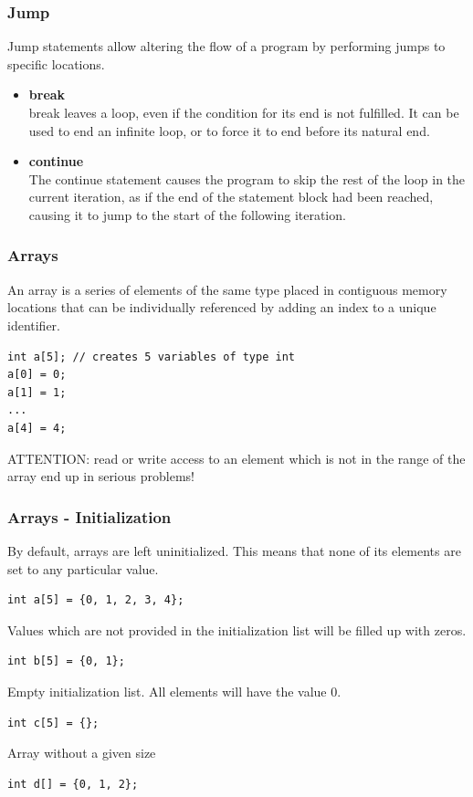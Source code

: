 \begin{frame}[fragile]
  \frametitle{Jump}
  Jump statements allow altering the flow of a program by performing jumps to specific locations.
  \begin{itemize}
  \item {\bf break}\\
  break leaves a loop, even if the condition for its end is not fulfilled.
  It can be used to end an infinite loop, or to force it to end before its natural end.
  \item {\bf continue}\\
  The continue statement causes the program to skip the rest of the loop in the current iteration, as if the end of the statement block had been reached,
  causing it to jump to the start of the following iteration.
  \end{itemize}
\end{frame}

\begin{frame}[fragile]
\frametitle{Arrays}
An array is a series of elements of the same type placed in contiguous memory locations that can
be individually referenced by adding an index to a unique identifier.
\begin{lstlisting}
int a[5]; // creates 5 variables of type int
a[0] = 0;
a[1] = 1;
...
a[4] = 4;
\end{lstlisting}
ATTENTION: read or write access to an element which is not in the range of the array
end up in serious problems!
\end{frame}

\begin{frame}[fragile]
\frametitle{Arrays - Initialization}
By default, arrays are left uninitialized. This means that none of its elements are set to any particular value.
\begin{lstlisting}
int a[5] = {0, 1, 2, 3, 4};
\end{lstlisting}

Values which are not provided in the initialization list will be filled up with zeros.
\begin{lstlisting}
int b[5] = {0, 1};
\end{lstlisting}

Empty initialization list. All elements will have the value 0.
\begin{lstlisting}
int c[5] = {};
\end{lstlisting}

Array without a given size
\begin{lstlisting}
int d[] = {0, 1, 2};
\end{lstlisting}

\end{frame}

